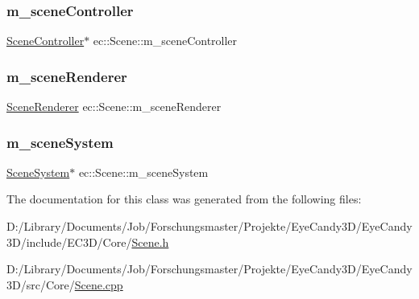 \mbox{\label{classec_1_1_scene_aa6a8f71066fc44162b1c80341840d5fb}} 
\subsubsection{\texorpdfstring{m\+\_\+scene\+Controller}{m\_sceneController}}
{\footnotesize\ttfamily \mbox{\hyperlink{classec_1_1_scene_controller}{Scene\+Controller}}$\ast$ ec\+::\+Scene\+::m\+\_\+scene\+Controller\hspace{0.3cm}{\ttfamily [protected]}}

\mbox{\label{classec_1_1_scene_a17a2c241cec6bda0a5895b353aa28fa7}} 
\subsubsection{\texorpdfstring{m\+\_\+scene\+Renderer}{m\_sceneRenderer}}
{\footnotesize\ttfamily \mbox{\hyperlink{classec_1_1_scene_renderer}{Scene\+Renderer}} ec\+::\+Scene\+::m\+\_\+scene\+Renderer\hspace{0.3cm}{\ttfamily [protected]}}

\mbox{\label{classec_1_1_scene_ad63e472baf8e283c596891384ea98aad}} 
\subsubsection{\texorpdfstring{m\+\_\+scene\+System}{m\_sceneSystem}}
{\footnotesize\ttfamily \mbox{\hyperlink{classec_1_1_scene_system}{Scene\+System}}$\ast$ ec\+::\+Scene\+::m\+\_\+scene\+System\hspace{0.3cm}{\ttfamily [protected]}}



The documentation for this class was generated from the following files\+:\begin{DoxyCompactItemize}
\item 
D\+:/\+Library/\+Documents/\+Job/\+Forschungsmaster/\+Projekte/\+Eye\+Candy3\+D/\+Eye\+Candy3\+D/include/\+E\+C3\+D/\+Core/\mbox{\hyperlink{_scene_8h}{Scene.\+h}}\item 
D\+:/\+Library/\+Documents/\+Job/\+Forschungsmaster/\+Projekte/\+Eye\+Candy3\+D/\+Eye\+Candy3\+D/src/\+Core/\mbox{\hyperlink{_scene_8cpp}{Scene.\+cpp}}\end{DoxyCompactItemize}
